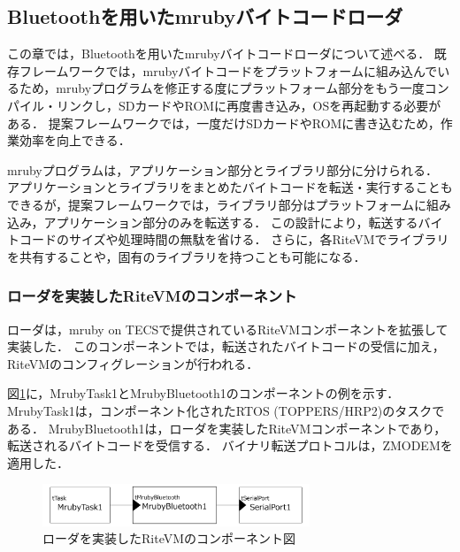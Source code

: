 \documentclass[submit,techrep]{ipsj}
\begin{document}
\subsection{Bluetoothを用いたmrubyバイトコードローダ}
\label{sec:mruby bytecode loader using Bluetooth}
この章では，Bluetoothを用いたmrubyバイトコードローダについて述べる．
既存フレームワークでは，mrubyバイトコードをプラットフォームに組み込んでいるため，mrubyプログラムを修正する度にプラットフォーム部分をもう一度コンパイル・リンクし，SDカードやROMに再度書き込み，OSを再起動する必要がある．
提案フレームワークでは，一度だけSDカードやROMに書き込むため，作業効率を向上できる．

mrubyプログラムは，アプリケーション部分とライブラリ部分に分けられる．
アプリケーションとライブラリをまとめたバイトコードを転送・実行することもできるが，提案フレームワークでは，ライブラリ部分はプラットフォームに組み込み，アプリケーション部分のみを転送する．
この設計により，転送するバイトコードのサイズや処理時間の無駄を省ける．
さらに，各RiteVMでライブラリを共有することや，固有のライブラリを持つことも可能になる．


\subsubsection{ローダを実装したRiteVMのコンポーネント}
ローダは，mruby on TECSで提供されているRiteVMコンポーネント\cite{par:mrubyonTECS}を拡張して実装した．
このコンポーネントでは，転送されたバイトコードの受信に加え，RiteVMのコンフィグレーションが行われる．

図\ref{fig:component_bluetooth}に，MrubyTask1とMrubyBluetooth1のコンポーネントの例を示す．
MrubyTask1は，コンポーネント化されたRTOS (TOPPERS/HRP2)のタスクである．
MrubyBluetooth1は，ローダを実装したRiteVMコンポーネントであり，転送されるバイトコードを受信する．
バイナリ転送プロトコルは，ZMODEMを適用した．

\begin{figure}[t]
    \centering
    \includegraphics[width=8cm,clip]{../EMSOFT2016/figure/component_bluetooth.pdf}
    \vspace{-2mm}
    \caption{ローダを実装したRiteVMのコンポーネント図}
\vspace{-5mm}
    \label{fig:component_bluetooth}
\end{figure}
\end{document}
